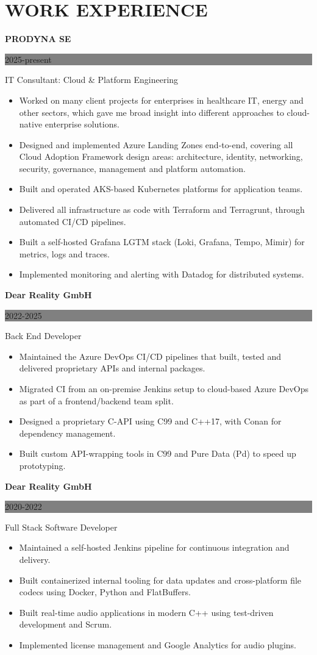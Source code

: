 \documentclass[paper=a4,fontsize=9pt]{scrartcl}
\newcommand{\sepspace}{\vspace*{1em}}
\newcommand{\NewPart}[1]{\section*{\uppercase{#1}}}
\newcommand{\ExperienceEntry}[4]{
	\noindent \textbf{#1} \hfill
	\colorbox{Grey}{
		\parbox{6em}{
		\hfill\color{White}#2}} \par
	\noindent #3 \par
    \noindent \small #4
	\normalsize \par
}
\begin{document}
\NewPart{Work Experience}{}
\ExperienceEntry{PRODYNA SE}{2025-present}{IT Consultant: Cloud \& Platform Engineering}{
    \begin{itemize}[itemsep=0pt, topsep=1pt, leftmargin=1.2em]
        \item Worked on many client projects for enterprises in healthcare IT, energy and other sectors, which gave me broad insight into different approaches to cloud-native enterprise solutions.
        \item Designed and implemented Azure Landing Zones end-to-end, covering all Cloud Adoption Framework design areas: architecture, identity, networking, security, governance, management and platform automation.
        \item Built and operated AKS-based Kubernetes platforms for application teams.
        \item Delivered all infrastructure as code with Terraform and Terragrunt, through automated CI/CD pipelines.
        \item Built a self-hosted Grafana LGTM stack (Loki, Grafana, Tempo, Mimir) for metrics, logs and traces.
        \item Implemented monitoring and alerting with Datadog for distributed systems.
    \end{itemize}
}
\sepspace
\ExperienceEntry{Dear Reality GmbH}{2022-2025}{Back End Developer}{
    \begin{itemize}[itemsep=0pt, topsep=1pt, leftmargin=1.2em]
        \item Maintained the Azure DevOps CI/CD pipelines that built, tested and delivered proprietary APIs and internal packages.
        \item Migrated CI from an on-premise Jenkins setup to cloud-based Azure DevOps as part of a frontend/backend team split.
        \item Designed a proprietary C-API using C99 and C++17, with Conan for dependency management.
        \item Built custom API-wrapping tools in C99 and Pure Data (Pd) to speed up prototyping.
    \end{itemize}
}
\sepspace
\ExperienceEntry{Dear Reality GmbH}{2020-2022}{Full Stack Software Developer}{
    \begin{itemize}[itemsep=0pt, topsep=1pt, leftmargin=1.2em]
        \item Maintained a self-hosted Jenkins pipeline for continuous integration and delivery.
        \item Built containerized internal tooling for data updates and cross-platform file codecs using Docker, Python and FlatBuffers.
        \item Built real-time audio applications in modern C++ using test-driven development and Scrum.
        \item Implemented license management and Google Analytics for audio plugins.
    \end{itemize}
}
\end{document}
